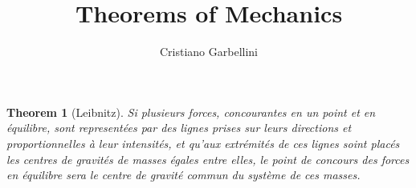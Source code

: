 \documentclass[a4paper,11pt]{article}
\author{Cristiano Garbellini}
\title{Theorems of Mechanics}
\theoremstyle{plain}
\newtheorem{theorem}{Theorem}
\begin{document}
\maketitle

\begin{theorem}[Leibnitz]
Si plusieurs forces, concourantes en un point et en équilibre, sont representées par des
lignes prises sur leurs directions et proportionnelles à leur intensités, et qu'aux extrémités
de ces lignes soint placés les centres de gravités de masses égales entre elles, le point de
concours des forces en équilibre sera le centre de gravité commun du système de ces
masses.
\end{theorem}
\end{document}
